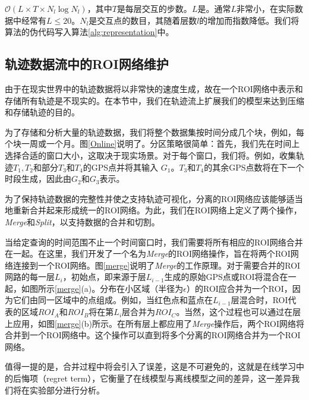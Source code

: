 $\mathcal{O}(L\times T\times N_l\log N_l)$，其中$T$是每层交互的步数。$L$是。通常$L$非常小，在实际数据中经常有$L\leq20$。$N_l$是交互点的数目，其随着层数$l$的增加而指数降低。我们将算法的伪代码写入算法\ref{alg:representation}中。

\subsection{轨迹数据流中的ROI网络维护}
由于在现实世界中的轨迹数据将以非常快的速度生成，故在一个ROI网络中表示和存储所有轨迹是不现实的。在本节中，我们在轨迹流上扩展我们的模型来达到压缩和存储轨迹的目的。


为了存储和分析大量的轨迹数据，我们将整个数据集按时间分成几个块，例如，每个块一周或一个月。图\ref{Online}说明了。分区策略很简单：首先，我们先在时间上选择合适的窗口大小，这取决于现实场景。对于每个窗口，我们将。例如，收集轨迹$T_1,T_2$和部分$T_3$和$T_4$的GPS点并将其输入 $G_1$。$T_3$和$T_4$的其余GPS点数将在下一个时段生成，因此由$G_2$和$G_3$表示。

为了保持轨迹数据的完整性并使之支持轨迹可视化，分离的ROI网络应该能够适当地重新合并起来形成统一的ROI网络。为此，我们在ROI网络上定义了两个操作，\emph{Merge}和\emph{Split}，以支持数据的合并和切割。


当给定查询的时间范围不止一个时间窗口时，我们需要将所有相应的ROI网络合并在一起。在这里，我们开发了一个名为\emph{Merge}的ROI网络操作，旨在将两个ROI网络连接到一个ROI网络。图\ref{merge}说明了\emph{Merge}的工作原理。对于需要合并的ROI网路的每一层$L_i$，初始点，即来源于层$L_{i-1}$生成的原始GPS点或ROI将混合在一起，如图所示\ref{merge}(a)。分布在小区域（半径为$\epsilon$）的ROI应合并为一个ROI，因为它们由同一区域中的点组成。例如，当红色点和蓝点在$L_{i-1}$层混合时，ROI代表的区域${ROI}_A$和${ROI}_B$将在第$L_i$层合并为${ROI}_C$。当然，这个过程也可以通过在层上应用，如图\ref{merge}(b)所示。在所有层上都应用了\emph{Merge}操作后，两个ROI网络将合并到一个ROI网络中。这个操作可以直到将多个分离的ROI网络合并为一个ROI网络。

值得一提的是，合并过程中将会引入了误差，这是不可避免的，这就是在线学习中的后悔项（regret term），它衡量了在线模型与离线模型之间的差异，这一差异我们将在实验部分进行分析。

